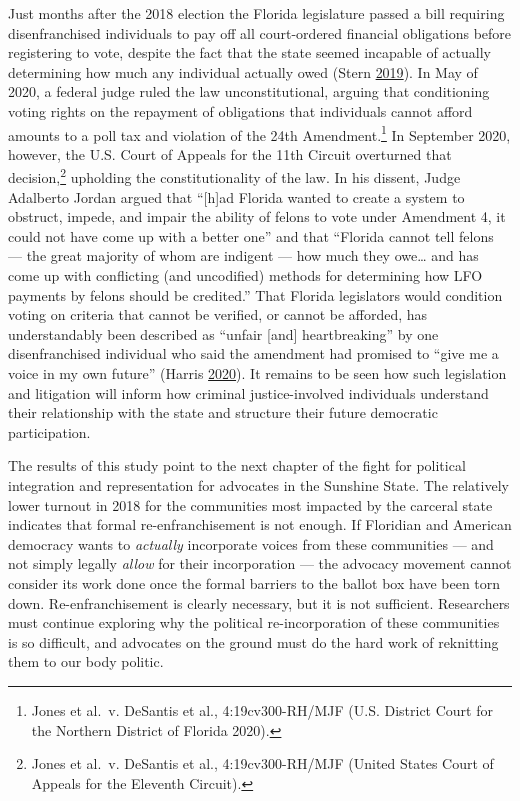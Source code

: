 \documentclass[
  12pt,
]{article}
\begin{document}
Just months after the 2018 election the Florida legislature passed a bill requiring disenfranchised individuals to pay off all court-ordered financial obligations before registering to vote, despite the fact that the state seemed incapable of actually determining how much any individual actually owed (Stern \protect\hyperlink{ref-Stern2019}{2019}). In May of 2020, a federal judge ruled the law unconstitutional, arguing that conditioning voting rights on the repayment of obligations that individuals cannot afford amounts to a poll tax and violation of the 24th Amendment.\footnote{Jones et al.~v. DeSantis et al., 4:19cv300-RH/MJF (U.S. District Court for the Northern District of Florida 2020).} In September 2020, however, the U.S. Court of Appeals for the 11th Circuit overturned that decision,\footnote{Jones et al.~v. DeSantis et al., 4:19cv300-RH/MJF (United States Court of Appeals for the Eleventh Circuit).} upholding the constitutionality of the law. In his dissent, Judge Adalberto Jordan argued that ``{[}h{]}ad Florida wanted to create a system to obstruct, impede, and impair the ability of felons to vote under Amendment 4, it could not have come up with a better one'' and that ``Florida cannot tell felons --- the great majority of whom are indigent --- how much they owe\ldots{} and has come up with conflicting (and uncodified) methods for determining how LFO payments by felons should be credited.'' That Florida legislators would condition voting on criteria that cannot be verified, or cannot be afforded, has understandably been described as ``unfair {[}and{]} heartbreaking'' by one disenfranchised individual who said the amendment had promised to ``give me a voice in my own future'' (Harris \protect\hyperlink{ref-Harris2020}{2020}). It remains to be seen how such legislation and litigation will inform how criminal justice-involved individuals understand their relationship with the state and structure their future democratic participation.

The results of this study point to the next chapter of the fight for political integration and representation for advocates in the Sunshine State. The relatively lower turnout in 2018 for the communities most impacted by the carceral state indicates that formal re-enfranchisement is not enough. If Floridian and American democracy wants to \emph{actually} incorporate voices from these communities --- and not simply legally \emph{allow} for their incorporation --- the advocacy movement cannot consider its work done once the formal barriers to the ballot box have been torn down. Re-enfranchisement is clearly necessary, but it is not sufficient. Researchers must continue exploring why the political re-incorporation of these communities is so difficult, and advocates on the ground must do the hard work of reknitting them to our body politic.
\end{document}

